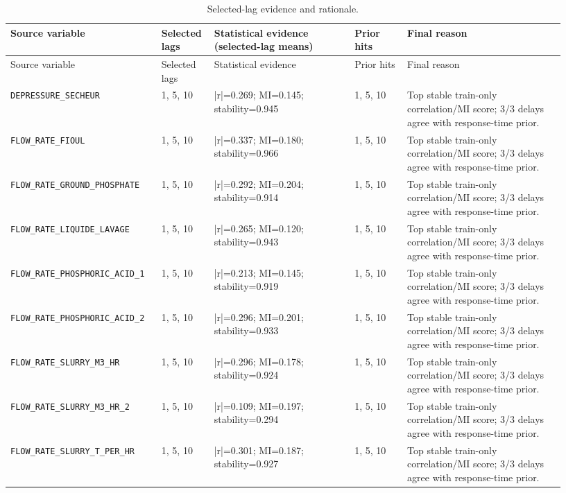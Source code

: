 \documentclass[10pt,a4paper]{article}
\begin{document}
\begin{landscape}\scriptsize\begin{longtable}{p{0.24\linewidth}p{0.09\linewidth}p{0.24\linewidth}p{0.09\linewidth}p{0.27\linewidth}}\caption{Selected-lag evidence and rationale.}\\\toprule Source variable & Selected lags & Statistical evidence (selected-lag means) & Prior hits & Final reason \\\midrule\endfirsthead\toprule Source variable & Selected lags & Statistical evidence & Prior hits & Final reason \\\midrule\endhead
\nolinkurl{DEPRESSURE_SECHEUR} & 1, 5, 10 & |r|=0.269; MI=0.145; stability=0.945 & 1, 5, 10 & Top stable train-only correlation/MI score; 3/3 delays agree with response-time prior. \\
\nolinkurl{FLOW_RATE_FIOUL} & 1, 5, 10 & |r|=0.337; MI=0.180; stability=0.966 & 1, 5, 10 & Top stable train-only correlation/MI score; 3/3 delays agree with response-time prior. \\
\nolinkurl{FLOW_RATE_GROUND_PHOSPHATE} & 1, 5, 10 & |r|=0.292; MI=0.204; stability=0.914 & 1, 5, 10 & Top stable train-only correlation/MI score; 3/3 delays agree with response-time prior. \\
\nolinkurl{FLOW_RATE_LIQUIDE_LAVAGE} & 1, 5, 10 & |r|=0.265; MI=0.120; stability=0.943 & 1, 5, 10 & Top stable train-only correlation/MI score; 3/3 delays agree with response-time prior. \\
\nolinkurl{FLOW_RATE_PHOSPHORIC_ACID_1} & 1, 5, 10 & |r|=0.213; MI=0.145; stability=0.919 & 1, 5, 10 & Top stable train-only correlation/MI score; 3/3 delays agree with response-time prior. \\
\nolinkurl{FLOW_RATE_PHOSPHORIC_ACID_2} & 1, 5, 10 & |r|=0.296; MI=0.201; stability=0.933 & 1, 5, 10 & Top stable train-only correlation/MI score; 3/3 delays agree with response-time prior. \\
\nolinkurl{FLOW_RATE_SLURRY_M3_HR} & 1, 5, 10 & |r|=0.296; MI=0.178; stability=0.924 & 1, 5, 10 & Top stable train-only correlation/MI score; 3/3 delays agree with response-time prior. \\
\nolinkurl{FLOW_RATE_SLURRY_M3_HR_2} & 1, 5, 10 & |r|=0.109; MI=0.197; stability=0.294 & 1, 5, 10 & Top stable train-only correlation/MI score; 3/3 delays agree with response-time prior. \\
\nolinkurl{FLOW_RATE_SLURRY_T_PER_HR} & 1, 5, 10 & |r|=0.301; MI=0.187; stability=0.927 & 1, 5, 10 & Top stable train-only correlation/MI score; 3/3 delays agree with response-time prior. \\

\end{longtable}
\end{landscape}
\end{document}
